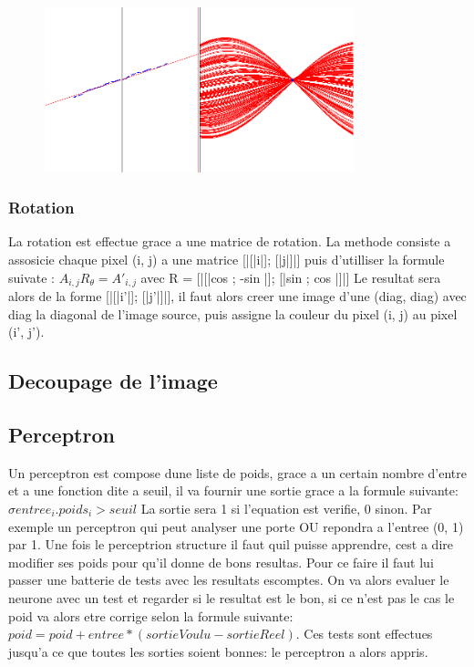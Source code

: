 \documentclass{article}
\begin{document}
\begin{figure}[hp]
\centering
\includegraphics[width=0.80\textwidth]{img/hough.png}
\end{figure}

\subsubsection{Rotation}
La rotation est effectue grace a une matrice de rotation. La methode consiste a assosicie chaque pixel (i, j) a une matrice [|[|i|]; [|j|]|] puis d'utilliser la formule suivate : 
$A_{i,j}R_{\theta} = A'_{i,j}$ avec R = [|[|cos \theta; -sin \theta|]; [|sin \theta; cos \theta|]|] 
Le resultat sera alors de la forme [|[|i'|]; [|j'|]|], il faut alors creer une image d'une (diag, diag) avec diag la diagonal de l'image source, puis assigne la couleur du pixel (i, j) au pixel (i', j').


\subsection{Decoupage de l'image}
\subsection{Perceptron}
Un perceptron est compose dune liste de poids, grace a un certain nombre d'entre et a une fonction dite a seuil, il va fournir une sortie grace a la formule suivante: 
$\sigma entree_{i}.poids_{i} > seuil$
La sortie sera 1 si l'equation est verifie, 0 sinon. Par exemple un perceptron qui peut analyser une porte OU repondra a l'entree (0, 1) par 1.
Une fois le perceptrion structure il faut quil puisse apprendre, cest a dire modifier ses poids pour qu'il donne de bons resultas. Pour ce faire il faut lui passer une batterie de tests avec les resultats escomptes. On va alors evaluer le neurone avec un test et regarder si le resultat est le bon, si ce n'est pas le cas le poid va alors etre corrige selon la formule suivante: 
$poid = poid + entree*(sortieVoulu - sortieReel)$.
Ces tests sont effectues jusqu'a ce que toutes les sorties soient bonnes: le perceptron a alors appris.
\end{document}
